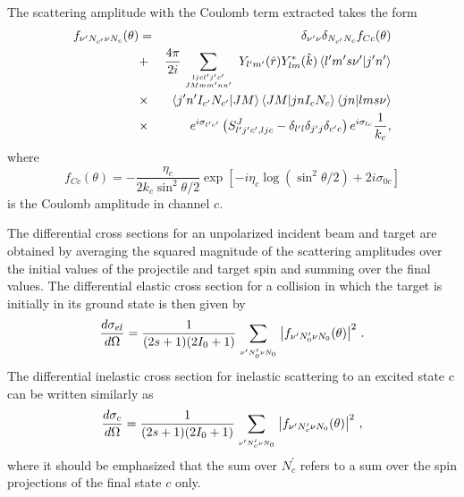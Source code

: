 The scattering amplitude with the Coulomb term extracted takes the form
\begin{eqnarray}
f_{\nu^{\prime}N_{c^{\prime}}\nu N_{c}}(\theta) & = &
   \delta_{\nu^{\prime}\nu}\delta_{N_{c^{\prime}}N_{c}}f_{Cc}(\theta) \\
& + & \frac{4\pi}{2i}\sum_{{{ljcl^{\prime}j^{\prime}c^{\prime}\atop %
JMmm^{\prime}nn^{\prime}}}}\; Y_{l^{\prime}m^{\prime}}(\hat{r})Y_{lm}^{*}(%
\hat{k})\left\langle
l^{\prime}m^{\prime}s\nu^{\prime}|j^{\prime}n^{\prime}\right\rangle  \notag
\\
& \times &\left\langle
   j^{\prime}n^{\prime}I_{c^{\prime}}N_{c^{\prime}}|JM\right\rangle
   \left\langle JM|jnI_{c}N_{c}\right\rangle \left\langle jn|lms\nu\right\rangle
   \notag \\
&\times &
e^{i\sigma_{l^{\prime}c^{\prime}}}\left(S_{l^{\prime}j^{\prime}c^{%
  \prime},ljc}^{J}-\delta_{l^{\prime}l}\delta_{j^{\prime}j}\delta_{c^{%
  \prime}c}\right)e^{i\sigma_{lc}}\frac{1}{k_{c}}, \notag
\end{eqnarray}
where
\begin{equation}
f_{Cc}(\theta)=-\frac{\eta_{c}}{2k_{c}\sin^{2}\theta/2}\exp\left[%
-i\eta_{c}\log\left(\sin^{2}\theta/2\right)+2i\sigma_{0c}\right]
\end{equation}
is the Coulomb amplitude in channel $c$.

The differential cross sections for an unpolarized incident beam and target
are obtained by averaging the squared magnitude of the scattering amplitudes
over the initial values of the projectile and target spin and summing over
the final values. The differential elastic cross section for a collision in
which the target is initially in its ground state is then given by
\begin{equation}
\frac{d\sigma_{el}}{d\Omega}=\frac{1}{(2s+1)(2I_{0}+1)}\sum_{{{\atop{%
\nu^{\prime}N_{0}^{\prime}}{\nu N_{0}}}}}\left|f_{\nu^{\prime}N_{0}^{\prime}%
\nu N_{0}}(\theta)\right|^{2}\,.  \label{celf}
\end{equation}
The differential inelastic cross section for inelastic scattering to an
excited state $c$ can be written similarly as
\begin{equation}
\frac{d\sigma_{c}}{d\Omega}=\frac{1}{(2s+1)(2I_{0}+1)}\sum_{{{\atop{%
\nu^{\prime}N_{c}^{\prime}}{\nu N_{0}}}}}\left|f_{\nu^{\prime}N_{c}^{\prime}%
\nu N_{0}}(\theta)\right|^{2}\,,
\end{equation}
where it should be emphasized that the sum over $N_{c}^{\prime}$ refers to a
sum over the spin projections of the final state $c$ only.


